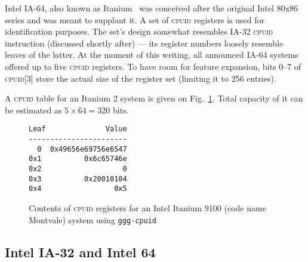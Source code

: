 \documentclass[a4paper,10pt,oneside,unicode]{article}
\newcommand{\cpuid}{\textsc{cpuid} }
\begin{document}
Intel IA-64, also known as Itanium\texttrademark~\cite{itanium-sdm} was conceived after the original Intel 80x86 series and was meant to supplant it. A set of \cpuid registers is used for identification purposes. The set's design somewhat resembles IA-32 \cpuid instruction (discussed shortly after) --- its register numbers loosely resemble leaves of the latter. At the moment of this writing, all announced IA-64 systems offered up to five \cpuid registers. To have room for feature expansion, bits 0--7 of \textsc{cpuid[3]} store the actual size of the register set (limiting it to 256 entries).

A \cpuid table for an Itanium 2 system is given on Fig.~\ref{fig:itanium-cpuid}. Total capacity of it can be estimated as $5 \times 64 = 320$ bits.

\begin{figure}
    \centering
\begin{verbatim}
Leaf              Value
-----------------------
  0  0x49656e69756e6547
0x1          0x6c65746e
0x2                   0
0x3          0x20010104
0x4                 0x5
\end{verbatim}
    
\caption{Contents of \cpuid registers for an Intel Itanium 9100 (code name Montvale) system using \texttt{ggg-cpuid}~\cite{ggg-cpuid}}\label{fig:itanium-cpuid}
\end{figure} 

%



\subsection{Intel IA-32 and Intel 64}
\end{document}
